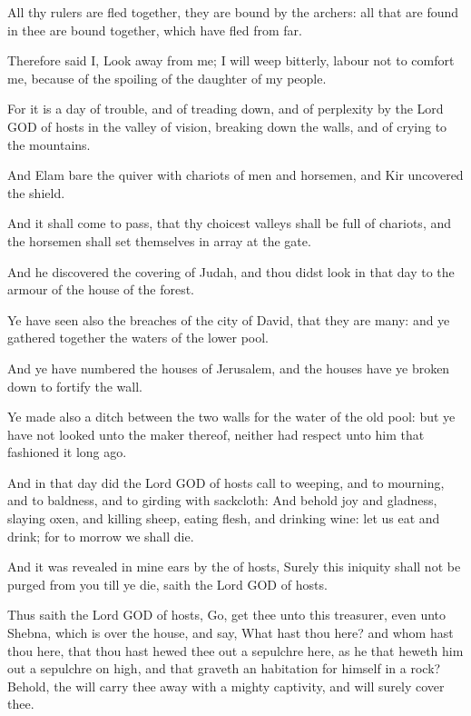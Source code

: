\verse All thy rulers are fled together, they are bound by the archers: all that are found in thee are bound together, which have fled from far.

\verse Therefore said I, Look away from me; I will weep bitterly, labour not to comfort me, because of the spoiling of the daughter of my people.

\verse For it is a day of trouble, and of treading down, and of perplexity by the Lord GOD of hosts in the valley of vision, breaking down the walls, and of crying to the mountains.

\verse And Elam bare the quiver with chariots of men and horsemen, and Kir uncovered the shield.

\verse And it shall come to pass, that thy choicest valleys shall be full of chariots, and the horsemen shall set themselves in array at the gate.

\verse And he discovered the covering of Judah, and thou didst look in that day to the armour of the house of the forest.

\verse Ye have seen also the breaches of the city of David, that they are many: and ye gathered together the waters of the lower pool.

\verse And ye have numbered the houses of Jerusalem, and the houses have ye broken down to fortify the wall.

\verse Ye made also a ditch between the two walls for the water of the old pool: but ye have not looked unto the maker thereof, neither had respect unto him that fashioned it long ago.

\verse And in that day did the Lord GOD of hosts call to weeping, and to mourning, and to baldness, and to girding with sackcloth: \verse And behold joy and gladness, slaying oxen, and killing sheep, eating flesh, and drinking wine: let us eat and drink; for to morrow we shall die.

\verse And it was revealed in mine ears by the \LORD of hosts, Surely this iniquity shall not be purged from you till ye die, saith the Lord GOD of hosts.

\verse Thus saith the Lord GOD of hosts, Go, get thee unto this treasurer, even unto Shebna, which is over the house, and say, \verse What hast thou here? and whom hast thou here, that thou hast hewed thee out a sepulchre here, as he that heweth him out a sepulchre on high, and that graveth an habitation for himself in a rock?  \verse Behold, the \LORD will carry thee away with a mighty captivity, and will surely cover thee.

